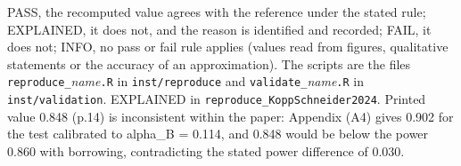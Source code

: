 \begin{table}[!htb]
\begin{minipage}{0.95\linewidth}
\footnotesize
PASS, the recomputed value agrees with the reference under the stated rule; EXPLAINED, it does not, and the reason is identified and recorded; FAIL, it does not; INFO, no pass or fail rule applies (values read from figures, qualitative statements or the accuracy of an approximation). The scripts are the files \texttt{reproduce\_}\textit{name}\texttt{.R} in \texttt{inst/reproduce} and \texttt{validate\_}\textit{name}\texttt{.R} in \texttt{inst/validation}. EXPLAINED in \texttt{reproduce\_KoppSchneider2024}. Printed value 0.848 (p.14) is inconsistent within the paper: Appendix (A4) gives 0.902 for the test calibrated to alpha\_B = 0.114, and 0.848 would be below the power 0.860 with borrowing, contradicting the stated power difference of 0.030.
\end{minipage}
\end{table}
